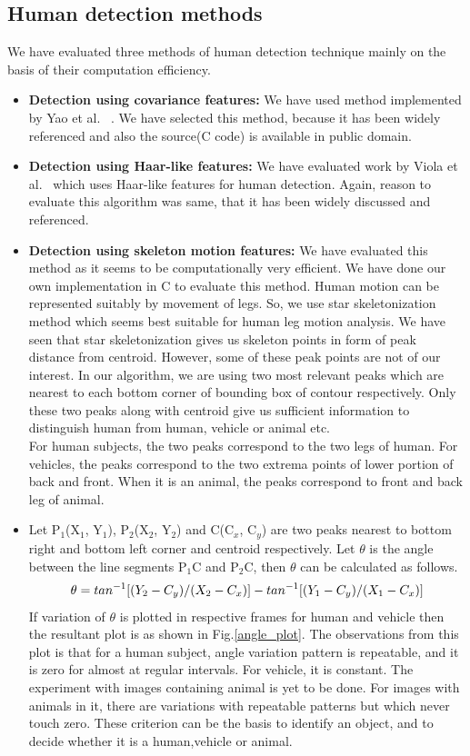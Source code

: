 \subsection{Human detection methods}
\indent We have evaluated three methods of human detection technique mainly on the
basis of their computation efficiency.
\begin{itemize}
\item \textbf{Detection using covariance features:} We have used method
 implemented by Yao et al. ~\cite{19}. We have selected this
 method, because it has been widely referenced and also the
 source(C code) is available in public domain.
\item \textbf{Detection using Haar-like features:} We have evaluated
 work by Viola et al.~\cite{16, 17} which uses Haar-like
 features for human detection. Again, reason to evaluate this
 algorithm was same, that it has been widely discussed and
 referenced.
\item \textbf{Detection using skeleton motion features:} We have
 evaluated this method as it seems to be computationally very
 efficient. We have done our own implementation in C to evaluate
 this method. Human motion can be represented suitably by
 movement of legs. So, we use star skeletonization method which
 seems best suitable for human leg motion analysis. We have seen
 that star skeletonization gives us skeleton points in form of peak
 distance from centroid. However, some of these peak points are
 not of our interest. In our algorithm, we are using two most relevant
 peaks which are nearest to each bottom corner of bounding box of
 contour respectively. Only these two peaks along with centroid
 give us sufficient information to distinguish human from
 human, vehicle or animal etc.\\
\indent For human subjects, the two peaks correspond to the two legs of
human. For vehicles, the peaks correspond to the two extrema points of
lower portion of back and front. When it is an animal, the peaks
correspond to front and back leg of animal.\\
\item Let P$_1$(X$_1$, Y$_1$), P$_2$(X$_2$, Y$_2$) and C(C$_x$, C$_y$)
are two peaks nearest to bottom right and bottom left corner and
centroid respectively. Let $\theta$ is the angle between the line
segments P$_1$C and P$_2$C, then $\theta$ can be calculated as
follows.\\
%
 \begin{equation}
 \theta = tan^{-1}[(Y_2 - C_y) / (X_2 - C_x)] \\ - tan^{-1}[(Y_1 - C_y) / (X_1 - C_x)]
 \end{equation}
%
\indent If variation of $\theta$ is plotted in respective frames for
human and vehicle then the resultant plot is as shown in
Fig.\ref{angle_plot}. The observations from this plot is that for a
human subject, angle variation pattern is repeatable, and it is zero for
almost at regular intervals. For vehicle, it is constant. The
experiment with images containing animal is yet to be done. For images
with animals in it, there are variations with repeatable patterns but
which never touch zero. These criterion can be the basis to identify an
object, and to decide whether it is a human,vehicle or animal.


\end{itemize}
